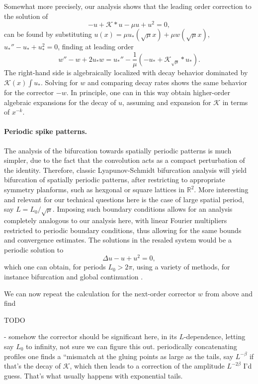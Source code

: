 \documentclass[10pt]{article}
\newcommand{\R}{\mathbb{R}}
\newcommand{\K}{\mathcal{K}}
\begin{document}
Somewhat more precisely, our analysis shows that the leading order correction to the solution of 
\[
-u+\K*u-\mu u + u^2=0,
\]
can be found by substituting $u(x)=\mu u_*(\sqrt{\mu}x)+\mu w(\sqrt\mu x)$, $u_*''-u_*+u_*^2=0$,
finding at leading order 
\[
w''- w+2 u_*w=u_*''-\frac{1}{\mu}(-u_*+\K_{\sqrt{\mu}}*u_*).
\]
The right-hand side is algebraically localized with decay behavior dominated by $\K(x)\int u_*$. Solving for $ w$ and comparing decay rates shows the same behavior for the corrector $-w$. In principle, one can in this way obtain higher-order algebraic expansions for the decay of $u$, assuming and expansion for $\K$ in terms of $x^{-k}$. 



\paragraph{Periodic spike patterns.} The analysis of the bifurcation towards spatially periodic patterns is much simpler, due to the fact that the convolution acts as a compact perturbation of the identity. Therefore, classic Lyapunov-Schmidt bifurcation analysis will yield bifurcation of spatially periodic patterns, after restricting to appropriate symmetry planforms, such as hexgonal or square lattices in $\R^2$. More interesting and relevant for our technical questions here is the case of large spatial period, say $L= L_0/\sqrt\mu$. Imposing such boundary conditions allows for an analysis completely analogous to our analysis here, with linear Fourier multipliers restricted to periodic boundary conditions, thus allowing for the same bounds and convergence estimates. The solutions in the resaled system would be a periodic solution to 
\[
\Delta u -u+u^2=0, 
\]
which one can obtain, for periods $L_0>2\pi$, using a variety of methods, for instance bifurcation and global continuation \cite{kiel}. 

We can now repeat the calculation for the next-order corrector $w$ from above and find


\begin{center}
{\color{red} TODO}
\end{center}

- somehow the corrector should be significant here, in its $L$-dependence, letting say $L_0$ to infinity, not sure we can figure this out. periodically concatenating profiles one finds a ``mismatch at the gluing points as large as the tails, say $L^{-\beta}$ if that's the decay of $\K$, which then leads to a correction of the amplitude $L^{-2\beta}$ I'd guess. That's what usually happens with exponential tails.
% 
% 
\end{document}
